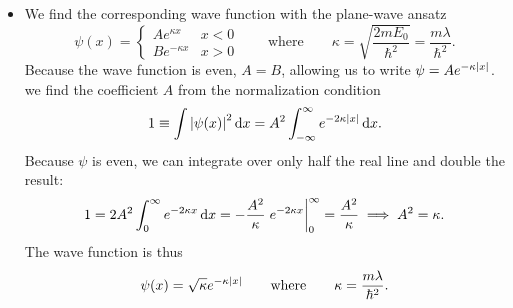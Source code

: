 \documentclass[11pt, a4paper]{article}
\newcommand{\diff}{\mathop{}\!\mathrm{d}} %
\newcommand{\eqtext}[1]{\qquad \text{#1} \qquad}
\begin{document}
\begin{itemize}
	\item We find the corresponding wave function with the plane-wave ansatz
	\begin{equation*}
		\psi(x) =
		\begin{cases}
			A e^{\kappa x} & x < 0\\
			B e^{-\kappa x} & x > 0
		\end{cases}
		\eqtext{where} \kappa = \sqrt{\frac{2mE_{0}}{\hbar^{2}}} = \frac{m\lambda}{\hbar^{2}}.
	\end{equation*}
	Because the wave function is even, $ A = B $, allowing us to write $ \psi = Ae^{-\kappa \abs{x}} $. we find the coefficient $ A $ from the normalization condition
	\begin{equation*}
		1 \equiv \int \abs{\psi(x)}^{2} \diff x = A^{2} \int_{-\infty}^{\infty} e^{-2\kappa \abs{x}} \diff x.
	\end{equation*}
	Because $ \psi $ is even, we can integrate over only half the real line and double the result:
	\begin{equation*}
		1 = 2A^{2} \int_{0}^{\infty} e^{-2\kappa x} \diff x = - \frac{A^{2}}{\kappa} \eval{e^{-2\kappa x}}_{0}^{\infty} = \frac{A^{2}}{\kappa} \implies A^{2} = \kappa.
	\end{equation*}
	The wave function is thus
	\begin{equation*}
		\psi(x) = \sqrt{\kappa} e^{-\kappa \abs{x}} \eqtext{where} \kappa = \frac{m\lambda}{\hbar^{2}}.
	\end{equation*}
	
\end{itemize}
\end{document}

